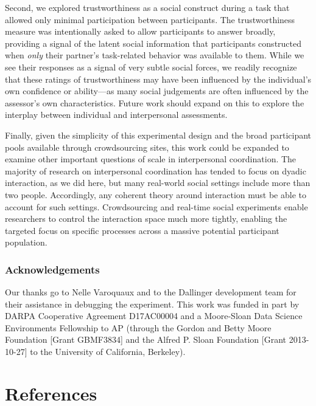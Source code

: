 \documentclass[10pt, letterpaper]{article}
\begin{document}
Second, we explored trustworthiness as a social construct during a task
that allowed only minimal participation between participants. The
trustworthiness measure was intentionally asked to allow participants to
answer broadly, providing a signal of the latent social information that
participants constructed when \emph{only} their partner's task-related
behavior was available to them. While we see their responses as a signal
of very subtle social forces, we readily recognize that these ratings of
trustworthiness may have been influenced by the individual's own
confidence or ability---as many social judgements are often influenced
by the assessor's own characteristics. Future work should expand on this
to explore the interplay between individual and interpersonal
assessments.

Finally, given the simplicity of this experimental design and the broad
participant pools available through crowdsourcing sites, this work could
be expanded to examine other important questions of scale in
interpersonal coordination. The majority of research on interpersonal
coordination has tended to focus on dyadic interaction, as we did here,
but many real-world social settings include more than two people.
Accordingly, any coherent theory around interaction must be able to
account for such settings. Crowdsourcing and real-time social
experiments enable researchers to control the interaction space much
more tightly, enabling the targeted focus on specific processes across a
massive potential participant population.

\subsubsection{Acknowledgements}\label{acknowledgements}

Our thanks go to Nelle Varoquaux and to the Dallinger development team
for their assistance in debugging the experiment. This work was funded
in part by DARPA Cooperative Agreement D17AC00004 and a Moore-Sloan Data
Science Environments Fellowship to AP (through the Gordon and Betty
Moore Foundation {[}Grant GBMF3834{]} and the Alfred P. Sloan Foundation
{[}Grant 2013-10-27{]} to the University of California, Berkeley).

\section{References}\label{references}

\setlength{\parindent}{-0.1in} \setlength{\leftskip}{0.125in} \noindent
\end{document}
